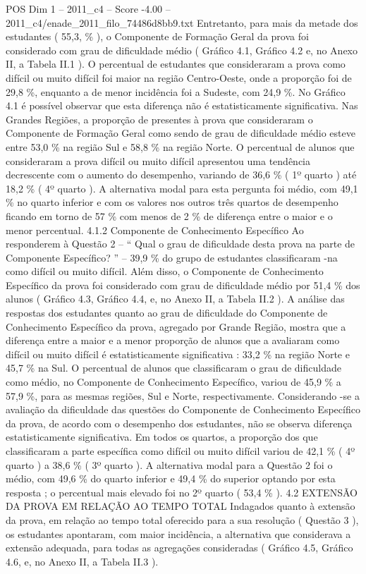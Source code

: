 \begin{textsample}{POS Dim 1 – 2011\_c4 – Score -4.00 – 2011\_c4/enade\_2011\_filo\_74486d8bb9.txt}
Entretanto, para mais da metade dos estudantes ( 55,3, \% ), o Componente de Formação Geral da prova foi considerado com grau de dificuldade médio ( Gráfico 4.1, Gráfico 4.2 e, no Anexo II, a Tabela II.1 ).
O percentual de estudantes que consideraram a prova como difícil ou muito difícil foi maior na região Centro-Oeste, onde a proporção foi de 29,8 \%, enquanto a de menor incidência foi a Sudeste, com 24,9 \%.
No Gráfico 4.1 é possível observar que esta diferença não é estatisticamente significativa.
Nas Grandes Regiões, a proporção de presentes à prova que consideraram o Componente de Formação Geral como sendo de grau de dificuldade médio esteve entre 53,0 \% na região Sul e 58,8 \% na região Norte.
O percentual de alunos que consideraram a prova difícil ou muito difícil apresentou uma tendência decrescente com o aumento do desempenho, variando de 36,6 \% ( 1º quarto ) até 18,2 \% ( 4º quarto ).
A alternativa modal para esta pergunta foi médio, com 49,1 \% no quarto inferior e com os valores nos outros três quartos de desempenho ficando em torno de 57 \% com menos de 2 \% de diferença entre o maior e o menor percentual. 4.1.2 Componente de Conhecimento Específico Ao responderem à Questão 2 – “ Qual o grau de dificuldade desta prova na parte de Componente Específico? ” – 39,9 \% do grupo de estudantes classificaram -na como difícil ou muito difícil.
Além disso, o Componente de Conhecimento Específico da prova foi considerado com grau de dificuldade médio por 51,4 \% dos alunos ( Gráfico 4.3, Gráfico 4.4, e, no Anexo II, a Tabela II.2 ).
A análise das respostas dos estudantes quanto ao grau de dificuldade do Componente de Conhecimento Específico da prova, agregado por Grande Região, mostra que a diferença entre a maior e a menor proporção de alunos que a avaliaram como difícil ou muito difícil é estatisticamente significativa : 33,2 \% na região Norte e 45,7 \% na Sul.
O percentual de alunos que classificaram o grau de dificuldade como médio, no Componente de Conhecimento Específico, variou de 45,9 \% a 57,9 \%, para as mesmas regiões, Sul e Norte, respectivamente.
Considerando -se a avaliação da dificuldade das questões do Componente de Conhecimento Específico da prova, de acordo com o desempenho dos estudantes, não se observa diferença estatisticamente significativa.
Em todos os quartos, a proporção dos que classificaram a parte específica como difícil ou muito difícil variou de 42,1 \% ( 4º quarto ) a 38,6 \% ( 3º quarto ).
A alternativa modal para a Questão 2 foi o médio, com 49,6 \% do quarto inferior e 49,4 \% do superior optando por esta resposta ; o percentual mais elevado foi no 2º quarto ( 53,4 \% ). 4.2 EXTENSÃO DA PROVA EM RELAÇÃO AO TEMPO TOTAL Indagados quanto à extensão da prova, em relação ao tempo total oferecido para a sua resolução ( Questão 3 ), os estudantes apontaram, com maior incidência, a alternativa que considerava a extensão adequada, para todas as agregações consideradas ( Gráfico 4.5, Gráfico 4.6, e, no Anexo II, a Tabela II.3 ).

\end{textsample}

